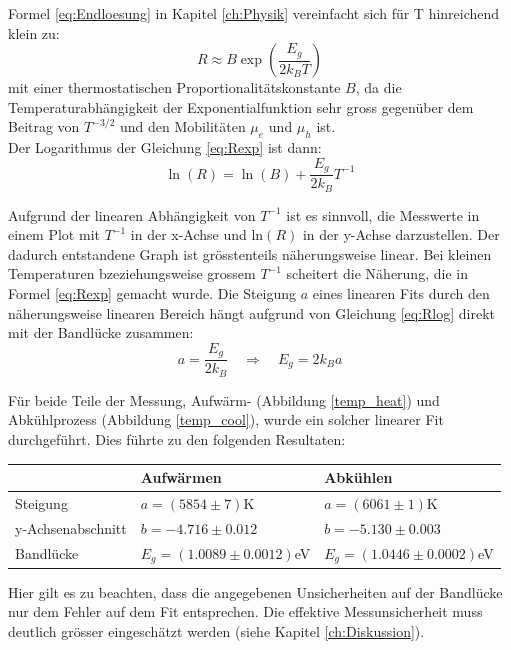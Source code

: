 \documentclass[a4paper,parskip,11pt, DIV12]{scrreprt}
\begin{document}
Formel \ref{eq:Endloesung} in Kapitel \ref{ch:Physik} vereinfacht sich für T hinreichend klein zu:
\begin{equation}
\label{eq:Rexp}
R \approx B \exp \left(\frac{E_g}{2 k_B T}\right)
\end{equation}
mit einer thermostatischen Proportionalitätskonstante $B$, da die Temperaturabhängigkeit der Exponentialfunktion sehr gross gegenüber dem Beitrag von $T^{-3/2}$ und den Mobilitäten $\mu_e$ und $\mu_h$ ist.
\\
Der Logarithmus der Gleichung \ref{eq:Rexp} ist dann:
\begin{equation}
\label{eq:Rlog}
\ln(R) = \ln (B) + \frac{E_g}{2 k_B} T^{-1}
\end{equation}

Aufgrund der linearen Abhängigkeit von $T^{-1}$ ist es sinnvoll, die Messwerte in einem Plot mit $T^{-1}$ in der x-Achse und ln$(R)$ in der y-Achse darzustellen. Der dadurch entstandene Graph ist grösstenteils näherungsweise linear. Bei kleinen Temperaturen bzeziehungsweise grossem $T^{-1}$ scheitert die Näherung, die in Formel \ref{eq:Rexp} gemacht wurde. Die Steigung $a$ eines linearen Fits durch den näherungsweise linearen Bereich hängt aufgrund von Gleichung \ref{eq:Rlog} direkt mit der Bandlücke zusammen:
\begin{equation}
\label{eq:bandgap}
a = \frac{E_g}{2 k_B} \quad \Rightarrow \quad E_g = 2 k_B a
\end{equation}


Für beide Teile der Messung, Aufwärm- (Abbildung \ref{temp_heat}) und Abkühlprozess (Abbildung \ref{temp_cool}), wurde ein solcher linearer Fit durchgeführt. Dies führte zu den folgenden Resultaten:

%
\begin{center}
\begin{tabular}{lll}
					& Aufwärmen 					& Abkühlen\\
	\hline
	Steigung 			& $a = (5854\pm7)$K			& $a = (6061\pm1)$K\\
	y-Achsenabschnitt	& $b = -4.716\pm0.012$			& $b = -5.130\pm0.003$\\
	Bandlücke			& $E_{g} = (1.0089\pm0.0012)$eV	& $E_{g} = (1.0446\pm0.0002)$eV\\
	
%
\end{tabular}
\end{center}
%

Hier gilt es zu beachten, dass die angegebenen Unsicherheiten auf der Bandlücke nur dem Fehler auf dem Fit entsprechen. Die effektive Messunsicherheit muss deutlich grösser eingeschätzt werden (siehe Kapitel \ref{ch:Diskussion}).
\end{document}
